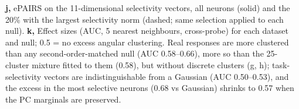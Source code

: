 {\textbf{j,} ePAIRS on the 11-dimensional selectivity vectors, all neurons (solid) and the 20\% with the largest selectivity norm (dashed; same selection applied to each null).
\textbf{k,} Effect sizes (AUC, 5 nearest neighbours, cross-probe) for each dataset and null; 0.5 = no excess angular clustering. Real responses are more clustered than any second-order-matched null (AUC 0.58--0.66), more so than the 25-cluster mixture fitted to them (0.58), but without discrete clusters (g, h); task-selectivity vectors are indistinguishable from a Gaussian (AUC 0.50--0.53), and the excess in the most selective neurons (0.68 vs Gaussian) shrinks to 0.57 when the PC marginals are preserved.}
\label{fig:selectivity_test}
